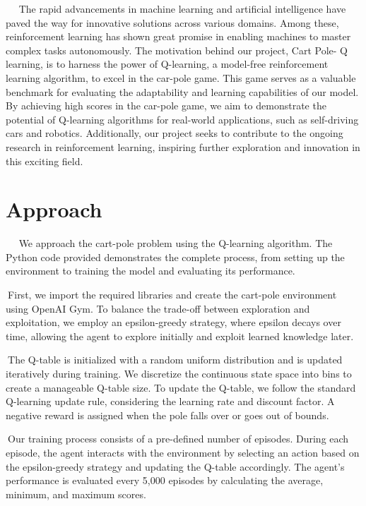 \documentclass{article}
\begin{document}
$\>$    $\>$   $\>$The rapid advancements in machine learning and artificial intelligence have paved the way for innovative solutions across various domains. Among these, reinforcement learning has shown great promise in enabling machines to master complex tasks autonomously. The motivation behind our project, Cart Pole- Q learning, is to harness the power of Q-learning, a model-free reinforcement learning algorithm, to excel in the car-pole game. This game serves as a valuable benchmark for evaluating the adaptability and learning capabilities of our model. By achieving high scores in the car-pole game, we aim to demonstrate the potential of Q-learning algorithms for real-world applications, such as self-driving cars and robotics. Additionally, our project seeks to contribute to the ongoing research in reinforcement learning, inspiring further exploration and innovation in this exciting field.
 
 
\section{Approach}

$\>$    $\>$   $\>$We approach the cart-pole problem using the Q-learning algorithm. The Python code provided demonstrates the complete process, from setting up the environment to training the model and evaluating its performance.

$\>$First, we import the required libraries and create the cart-pole environment using OpenAI Gym. To balance the trade-off between exploration and exploitation, we employ an epsilon-greedy strategy, where epsilon decays over time, allowing the agent to explore initially and exploit learned knowledge later.

$\>$The Q-table is initialized with a random uniform distribution and is updated iteratively during training. We discretize the continuous state space into bins to create a manageable Q-table size. To update the Q-table, we follow the standard Q-learning update rule, considering the learning rate and discount factor. A negative reward is assigned when the pole falls over or goes out of bounds.

$\>$Our training process consists of a pre-defined number of episodes. During each episode, the agent interacts with the environment by selecting an action based on the epsilon-greedy strategy and updating the Q-table accordingly. The agent's performance is evaluated every 5,000 episodes by calculating the average, minimum, and maximum scores.
\end{document}

